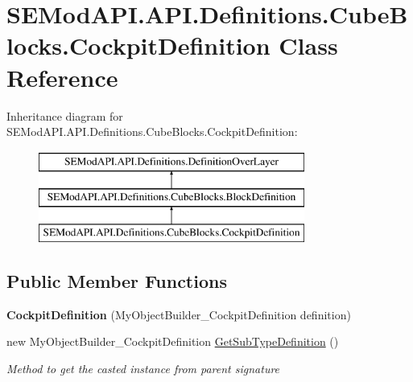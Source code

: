 \hypertarget{class_s_e_mod_a_p_i_1_1_a_p_i_1_1_definitions_1_1_cube_blocks_1_1_cockpit_definition}{}\section{S\+E\+Mod\+A\+P\+I.\+A\+P\+I.\+Definitions.\+Cube\+Blocks.\+Cockpit\+Definition Class Reference}
\label{class_s_e_mod_a_p_i_1_1_a_p_i_1_1_definitions_1_1_cube_blocks_1_1_cockpit_definition}
Inheritance diagram for S\+E\+Mod\+A\+P\+I.\+A\+P\+I.\+Definitions.\+Cube\+Blocks.\+Cockpit\+Definition\+:\begin{figure}[H]
\begin{center}
\leavevmode
\includegraphics[height=3.000000cm]{class_s_e_mod_a_p_i_1_1_a_p_i_1_1_definitions_1_1_cube_blocks_1_1_cockpit_definition}
\end{center}
\end{figure}
\subsection*{Public Member Functions}
\begin{DoxyCompactItemize}
\item 
\hypertarget{class_s_e_mod_a_p_i_1_1_a_p_i_1_1_definitions_1_1_cube_blocks_1_1_cockpit_definition_a79dd970d907a2f41f28622e6f27d7185}{}{\bfseries Cockpit\+Definition} (My\+Object\+Builder\+\_\+\+Cockpit\+Definition definition)\label{class_s_e_mod_a_p_i_1_1_a_p_i_1_1_definitions_1_1_cube_blocks_1_1_cockpit_definition_a79dd970d907a2f41f28622e6f27d7185}

\item 
new My\+Object\+Builder\+\_\+\+Cockpit\+Definition \hyperlink{class_s_e_mod_a_p_i_1_1_a_p_i_1_1_definitions_1_1_cube_blocks_1_1_cockpit_definition_a0056270765bdbceab3e8b6c3cb65566b}{Get\+Sub\+Type\+Definition} ()
\begin{DoxyCompactList}\small\item\em Method to get the casted instance from parent signature \end{DoxyCompactList}\end{DoxyCompactItemize}
